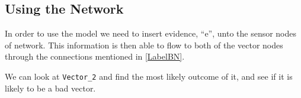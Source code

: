 \subsection{Using the Network}

In order to use the model we need to insert evidence, ``e'', unto the sensor
nodes of network. This information is then able to flow to both of the vector
nodes through the connections mentioned in \autoref{LabelBN}.


We can look at \texttt{Vector\_2} and find the most likely outcome of it, and
see if it is likely to be a bad vector.


